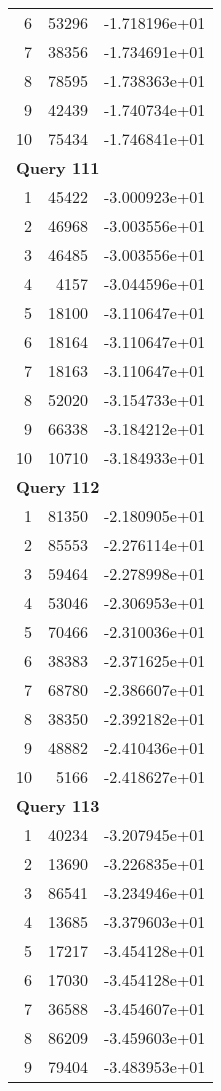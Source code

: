\begin{longtable}[{p}]{@{}rrp{}@{}}
6 & 53296 & -1.718196e+01 \\
7 & 38356 & -1.734691e+01 \\
8 & 78595 & -1.738363e+01 \\
9 & 42439 & -1.740734e+01 \\
10 & 75434 & -1.746841e+01 \\
\midrule
\multicolumn{3}{l}{\bfseries Query 111} \\
1 & 45422 & -3.000923e+01 \\
2 & 46968 & -3.003556e+01 \\
3 & 46485 & -3.003556e+01 \\
4 & 4157 & -3.044596e+01 \\
5 & 18100 & -3.110647e+01 \\
6 & 18164 & -3.110647e+01 \\
7 & 18163 & -3.110647e+01 \\
8 & 52020 & -3.154733e+01 \\
9 & 66338 & -3.184212e+01 \\
10 & 10710 & -3.184933e+01 \\
\midrule
\multicolumn{3}{l}{\bfseries Query 112} \\
1 & 81350 & -2.180905e+01 \\
2 & 85553 & -2.276114e+01 \\
3 & 59464 & -2.278998e+01 \\
4 & 53046 & -2.306953e+01 \\
5 & 70466 & -2.310036e+01 \\
6 & 38383 & -2.371625e+01 \\
7 & 68780 & -2.386607e+01 \\
8 & 38350 & -2.392182e+01 \\
9 & 48882 & -2.410436e+01 \\
10 & 5166 & -2.418627e+01 \\
\midrule
\multicolumn{3}{l}{\bfseries Query 113} \\
1 & 40234 & -3.207945e+01 \\
2 & 13690 & -3.226835e+01 \\
3 & 86541 & -3.234946e+01 \\
4 & 13685 & -3.379603e+01 \\
5 & 17217 & -3.454128e+01 \\
6 & 17030 & -3.454128e+01 \\
7 & 36588 & -3.454607e+01 \\
8 & 86209 & -3.459603e+01 \\
9 & 79404 & -3.483953e+01 \\

\end{longtable}
